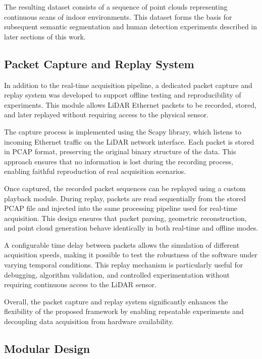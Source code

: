 The resulting dataset consists of a sequence of point clouds representing continuous scans of indoor environments. This dataset forms the basis for subsequent semantic segmentation and human detection experiments described in later sections of this work.

\subsection{Packet Capture and Replay System}
\label{subsec:packet_capture_replay}

In addition to the real-time acquisition pipeline, a dedicated packet capture and replay system was developed to support offline testing and reproducibility of experiments. This module allows LiDAR Ethernet packets to be recorded, stored, and later replayed without requiring access to the physical sensor.

The capture process is implemented using the Scapy library, which listens to incoming Ethernet traffic on the LiDAR network interface. Each packet is stored in PCAP format, preserving the original binary structure of the data.\cite{pcap_format} This approach ensures that no information is lost during the recording process, enabling faithful reproduction of real acquisition scenarios.

Once captured, the recorded packet sequences can be replayed using a custom playback module. During replay, packets are read sequentially from the stored PCAP file and injected into the same processing pipeline used for real-time acquisition. This design ensures that packet parsing, geometric reconstruction, and point cloud generation behave identically in both real-time and offline modes.

A configurable time delay between packets allows the simulation of different acquisition speeds, making it possible to test the robustness of the software under varying temporal conditions. This replay mechanism is particularly useful for debugging, algorithm validation, and controlled experimentation without requiring continuous access to the LiDAR sensor.

Overall, the packet capture and replay system significantly enhances the flexibility of the proposed framework by enabling repeatable experiments and decoupling data acquisition from hardware availability.

\subsection{Modular Design}
\label{subsec:modular_design}

